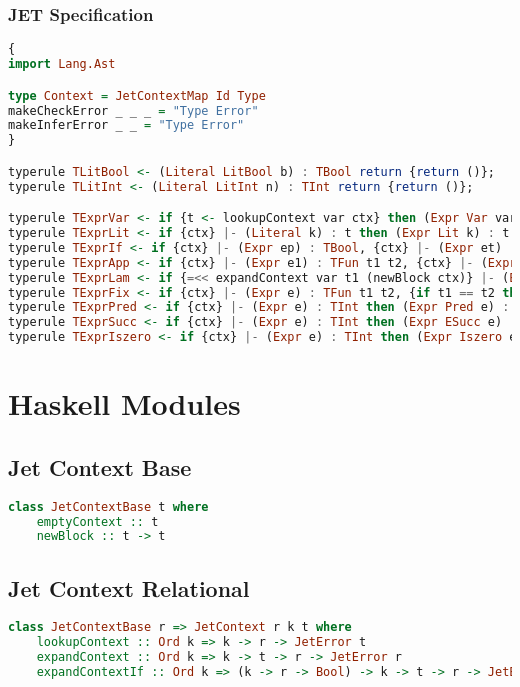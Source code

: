 \subsection{JET Specification}
\begin{lstlisting}[language=Haskell]
{
import Lang.Ast

type Context = JetContextMap Id Type
makeCheckError _ _ _ = "Type Error"
makeInferError _ _ = "Type Error"
}

typerule TLitBool <- (Literal LitBool b) : TBool return {return ()};
typerule TLitInt <- (Literal LitInt n) : TInt return {return ()};

typerule TExprVar <- if {t <- lookupContext var ctx} then (Expr Var var) : t return {return ()};
typerule TExprLit <- if {ctx} |- (Literal k) : t then (Expr Lit k) : t return {return ()} ;
typerule TExprIf <- if {ctx} |- (Expr ep) : TBool, {ctx} |- (Expr et) : t, {ctx} |- (Expr ef) : t then (Expr If ep et ef) : t return {return ()};
typerule TExprApp <- if {ctx} |- (Expr e1) : TFun t1 t2, {ctx} |- (Expr e2) : t1 then (Expr App e1 e2) : t2 return {return ()};
typerule TExprLam <- if {=<< expandContext var t1 (newBlock ctx)} |- (Expr e) : t2 then (Expr Lam var t1 e) : TFun t1 t2 return {return ()};
typerule TExprFix <- if {ctx} |- (Expr e) : TFun t1 t2, {if t1 == t2 then return () else fail "Type error"} then (Expr Fix e) : t1 return {return ()};
typerule TExprPred <- if {ctx} |- (Expr e) : TInt then (Expr Pred e) : TInt return {return ()};
typerule TExprSucc <- if {ctx} |- (Expr e) : TInt then (Expr ESucc e) : TInt return {return ()};
typerule TExprIszero <- if {ctx} |- (Expr e) : TInt then (Expr Iszero e) : TBool return {return ()};
\end{lstlisting}

\chapter{Haskell Modules}
\section{Jet Context Base}
\begin{lstlisting}[language=Haskell]
class JetContextBase t where
    emptyContext :: t
    newBlock :: t -> t
\end{lstlisting}
\section{Jet Context Relational}
\begin{lstlisting}[language=Haskell]
class JetContextBase r => JetContext r k t where
    lookupContext :: Ord k => k -> r -> JetError t
    expandContext :: Ord k => k -> t -> r -> JetError r
    expandContextIf :: Ord k => (k -> r -> Bool) -> k -> t -> r -> JetError r
\end{lstlisting}
